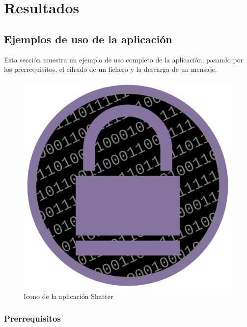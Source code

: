 
\chapter{Resultados} %

\label{Chapter5} %


\section{Ejemplos de uso de la aplicación}

Esta sección muestra un ejemplo de uso completo de la aplicación, pasando por los prerrequisitos, el cifrado de un fichero y la descarga de un mensaje.

\begin{figure}[!htb]
  \centering
  \includegraphics[scale=0.2]{Figures/launcher}
  \decoRule
  \caption[Shatter (Icono)]{Icono de la aplicación Shatter}
  \label{fig:launcher}
\end{figure}

\subsection{Prerrequisitos}

